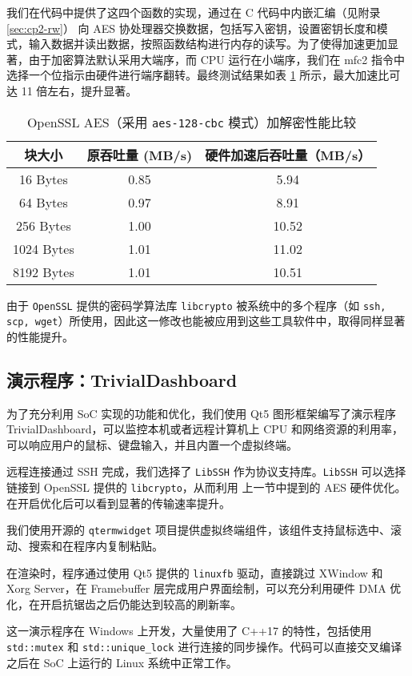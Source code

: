 我们在代码中提供了这四个函数的实现，通过在 C 代码中内嵌汇编（见附录 \ref{sec:cp2-rw}） 向 AES 协处理器交换数据，包括写入密钥，设置密钥长度和模式，输入数据并读出数据，按照函数结构进行内存的读写。为了使得加速更加显著，由于加密算法默认采用大端序，而 CPU 运行在小端序，我们在 mfc2 指令中选择一个位指示由硬件进行端序翻转。最终测试结果如表 \ref{table:openssl-speedup} 所示，最大加速比可达 11 倍左右，提升显著。

\begin{table}[htbp]
    \centering
    \caption{OpenSSL AES（采用 \texttt{aes-128-cbc} 模式）加解密性能比较}
    \label{table:openssl-speedup}
\begin{tabular}{|c|c|c|}
\hline
块大小 & 原吞吐量 (MB/s) & 硬件加速后吞吐量（MB/s）\\ \hline
16 Bytes & 0.85 & 5.94 \\ \hline
64 Bytes & 0.97 & 8.91 \\ \hline
256 Bytes & 1.00 & 10.52 \\ \hline
1024 Bytes & 1.01 & 11.02 \\ \hline
8192 Bytes & 1.01 & 10.51 \\ \hline
\end{tabular}
\end{table}

由于 \texttt{OpenSSL} 提供的密码学算法库 \texttt{libcrypto} 被系统中的多个程序（如 \texttt{ssh, scp, wget}）所使用，因此这一修改也能被应用到这些工具软件中，取得同样显著的性能提升。


\subsection{演示程序：TrivialDashboard}

为了充分利用 SoC 实现的功能和优化，我们使用 Qt5 图形框架编写了演示程序 TrivialDashboard，可以监控本机或者远程计算机上 CPU 和网络资源的利用率，可以响应用户的鼠标、键盘输入，并且内置一个虚拟终端。

远程连接通过 SSH 完成，我们选择了 \texttt{LibSSH} 作为协议支持库。\texttt{LibSSH} 可以选择链接到 OpenSSL 提供的 \texttt{libcrypto}，从而利用 上一节中提到的 AES 硬件优化。在开启优化后可以看到显著的传输速率提升。

我们使用开源的 \texttt{qtermwidget} 项目提供虚拟终端组件，该组件支持鼠标选中、滚动、搜索和在程序内复制粘贴。

在渲染时，程序通过使用 Qt5 提供的 \texttt{linuxfb} 驱动，直接跳过 XWindow 和 Xorg Server，在 Framebuffer 层完成用户界面绘制，可以充分利用硬件 DMA 优化，在开启抗锯齿之后仍能达到较高的刷新率。

这一演示程序在 Windows 上开发，大量使用了 C++17 的特性，包括使用 \texttt{std::mutex} 和 \texttt{std::unique\_lock} 进行连接的同步操作。代码可以直接交叉编译之后在 SoC 上运行的 Linux 系统中正常工作。
